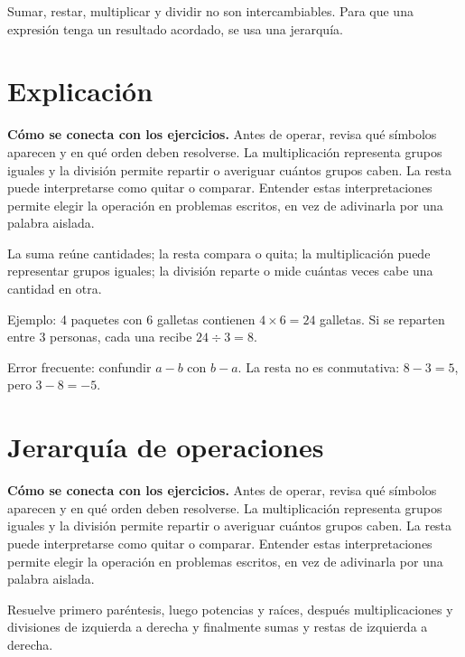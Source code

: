 \documentclass[10pt,oneside,openany]{book}
\begin{document}
\begin{idea}
Sumar, restar, multiplicar y dividir no son intercambiables. Para que una expresión tenga un resultado acordado, se usa una jerarquía.
\end{idea}

\section{Explicación}

\textbf{Cómo se conecta con los ejercicios.} Antes de operar, revisa qué símbolos aparecen y en qué orden deben resolverse. La multiplicación representa grupos iguales y la división permite repartir o averiguar cuántos grupos caben. La resta puede interpretarse como quitar o comparar. Entender estas interpretaciones permite elegir la operación en problemas escritos, en vez de adivinarla por una palabra aislada.

La suma reúne cantidades; la resta compara o quita; la multiplicación puede representar grupos iguales; la división reparte o mide cuántas veces cabe una cantidad en otra.



\begin{ejemplo}
Ejemplo: 4 paquetes con 6 galletas contienen $4\times6=24$ galletas. Si se reparten entre 3 personas, cada una recibe $24\div3=8$.
\end{ejemplo}

\begin{ojo}
Error frecuente: confundir $a-b$ con $b-a$. La resta no es conmutativa: $8-3=5$, pero $3-8=-5$.
\end{ojo}



\section{Jerarquía de operaciones}

\textbf{Cómo se conecta con los ejercicios.} Antes de operar, revisa qué símbolos aparecen y en qué orden deben resolverse. La multiplicación representa grupos iguales y la división permite repartir o averiguar cuántos grupos caben. La resta puede interpretarse como quitar o comparar. Entender estas interpretaciones permite elegir la operación en problemas escritos, en vez de adivinarla por una palabra aislada.

Resuelve primero paréntesis, luego potencias y raíces, después multiplicaciones y divisiones de izquierda a derecha y finalmente sumas y restas de izquierda a derecha.
\end{document}
